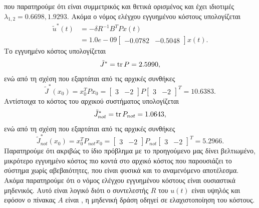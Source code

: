 που παρατηρούμε ότι είναι συμμετρικός και θετικά ορισμένος και έχει ιδιοτιμές
\( \lambda_{1,2} = 0.6698, 1.9293 \). Ακόμα ο νόμος ελέγχου εγγυημένου κόστους
υπολογίζεται
\begin{align*}
    \tilde{u}^*(t) &=
    -\delta R^{-1} B^T P x(t) \\
    &= 1.0e-09
    \begin{bmatrix}
        -0.0782 & -0.5048
    \end{bmatrix}x(t).
\end{align*}
Το εγγυημένο κόστος υπολογίζεται
\[
    \tilde{J}^* = \operatorname{tr}{P} = 2.5990,
\]
ενώ από τη σχέση που εξαρτάται από τις αρχικές συνθήκες
\[
    \tilde{J}^*(x_0) = x_0^{T}Px_0 =
    \begin{bmatrix}
        3 & -2
    \end{bmatrix}P
    \begin{bmatrix}
        3 & -2
    \end{bmatrix}^T = 10.6383.
\]
Αντίστοιχα το κόστος του αρχικού συστήματος υπολογίζεται
\[
    \tilde{J}^*_{not} = \operatorname{tr}{P}_{not} = 1.0643,
\]
ενώ από τη σχέση που εξαρτάται από τις αρχικές συνθήκες
\[
    \tilde{J}^*_{not}(x_0) = x_0^{T}P_{not}x_0 =
    \begin{bmatrix}
        3 & -2
    \end{bmatrix}P_{not}
    \begin{bmatrix}
        3 & -2
    \end{bmatrix}^T = 5.2966.
\]
Παρατηρούμε ότι ακριβώς το ίδιο πρόβλημα με το προηγούμενο μας δίνει βελτιωμένο,
μικρότερο εγγυημένο κόστος πιο κοντά στο αρχικό κόστος που παρουσιάζει το
σύστημα χωρίς αβεβαιότητες, που είναι φυσικά και το αναμενόμενο αποτέλεσμα.
Ακόμα παρατηρούμε ότι ο νόμος ελέγχου εγγυημένου κόστους είναι ουσιαστικά
μηδενικός. Αυτό είναι λογικό διότι ο συντελεστής \( R \) του \( u(t) \) είναι
υψηλός και εφόσον ο πίνακας \( A \) είναι , η μηδενική δράση οδηγεί
σε ελαχιστοποίηση του κόστους.

